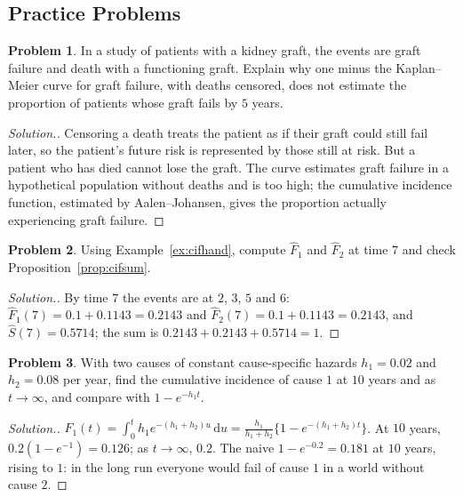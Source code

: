 \documentclass[11pt,a4paper]{article}
\numberwithin{equation}{section}
\theoremstyle{definition}
\newtheorem{problemx}{Problem}[subsection]
\newenvironment{problem}{\begin{problemx}}{\end{problemx}}
\newenvironment{solution}
  {\renewcommand{\qedsymbol}{}\begin{proof}[\textit{Solution}.]}
  {\end{proof}}
\begin{document}
\subsection{Practice Problems}

\begin{problem}
In a study of patients with a kidney graft, the events are graft failure and death with a functioning graft. Explain why one minus the Kaplan--Meier curve for graft failure, with deaths censored, does not estimate the proportion of patients whose graft fails by $5$ years.
\end{problem}

\begin{solution}
Censoring a death treats the patient as if their graft could still fail later, so the patient's future risk is represented by those still at risk. But a patient who has died cannot lose the graft. The curve estimates graft failure in a hypothetical population without deaths and is too high; the cumulative incidence function, estimated by Aalen--Johansen, gives the proportion actually experiencing graft failure.
\end{solution}

\begin{problem}
Using Example~\ref{ex:cifhand}, compute $\hat F_1$ and $\hat F_2$ at time $7$ and check Proposition~\ref{prop:cifsum}.
\end{problem}

\begin{solution}
By time $7$ the events are at $2$, $3$, $5$ and $6$: $\hat F_1(7) = 0.1 + 0.1143 = 0.2143$ and $\hat F_2(7) = 0.1 + 0.1143 = 0.2143$, and $\hat S(7) = 0.5714$; the sum is $0.2143 + 0.2143 + 0.5714 = 1$.
\end{solution}

\begin{problem}
With two causes of constant cause-specific hazards $h_1 = 0.02$ and $h_2 = 0.08$ per year, find the cumulative incidence of cause $1$ at $10$ years and as $t \to \infty$, and compare with $1 - e^{-h_1 t}$.
\end{problem}

\begin{solution}
$F_1(t) = \int_0^t h_1e^{-(h_1 + h_2)u}\,\mathrm du = \frac{h_1}{h_1 + h_2}\{1 - e^{-(h_1 + h_2)t}\}$. At $10$ years, $0.2(1 - e^{-1}) = 0.126$; as $t \to \infty$, $0.2$. The naive $1 - e^{-0.2} = 0.181$ at $10$ years, rising to $1$: in the long run everyone would fail of cause $1$ in a world without cause $2$.
\end{solution}
\end{document}
